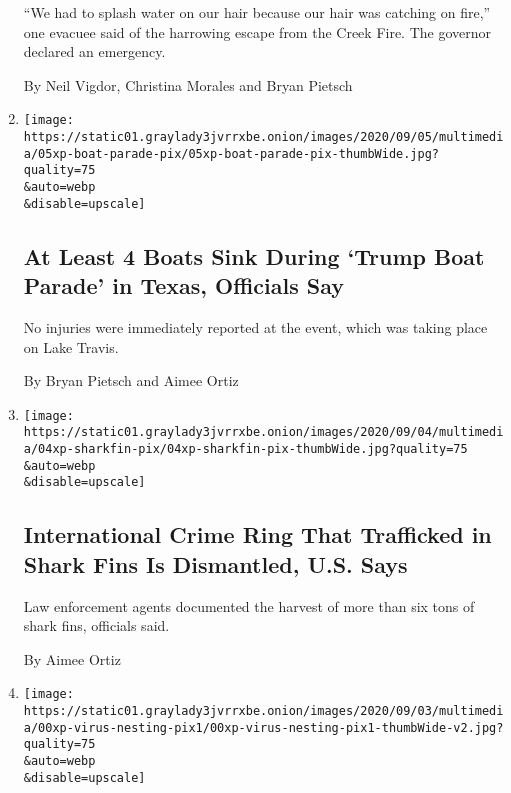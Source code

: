 \begin{enumerate}
  ``We had to splash water on our hair because our hair was catching on
  fire,'' one evacuee said of the harrowing escape from the Creek Fire.
  The governor declared an emergency.

  By Neil Vigdor, Christina Morales and Bryan Pietsch
\item
  \href{/2020/09/05/us/Texas-boat-parade-trump.html}{}

  \texttt{[image: https://static01.graylady3jvrrxbe.onion/images/2020/09/05/multimedia/05xp-boat-parade-pix/05xp-boat-parade-pix-thumbWide.jpg?quality=75\\\&auto=webp\\\&disable=upscale]}

  \hypertarget{at-least-4-boats-sink-during-trump-boat-parade-in-texas-officials-say}{%
  \subsection{At Least 4 Boats Sink During `Trump Boat Parade' in Texas,
  Officials
  Say}\label{at-least-4-boats-sink-during-trump-boat-parade-in-texas-officials-say}}

  No injuries were immediately reported at the event, which was taking
  place on Lake Travis.

  By Bryan Pietsch and Aimee Ortiz
\item
  \href{/2020/09/04/us/shark-fin-ring-georgia.html}{}

  \texttt{[image: https://static01.graylady3jvrrxbe.onion/images/2020/09/04/multimedia/04xp-sharkfin-pix/04xp-sharkfin-pix-thumbWide.jpg?quality=75\\\&auto=webp\\\&disable=upscale]}

  \hypertarget{international-crime-ring-that-trafficked-in-shark-fins-is-dismantled-us-says}{%
  \subsection{International Crime Ring That Trafficked in Shark Fins Is
  Dismantled, U.S.
  Says}\label{international-crime-ring-that-trafficked-in-shark-fins-is-dismantled-us-says}}

  Law enforcement agents documented the harvest of more than six tons of
  shark fins, officials said.

  By Aimee Ortiz
\item
  \href{/2020/09/04/business/coronavirus-home-upgrades.html}{}

  \texttt{[image: https://static01.graylady3jvrrxbe.onion/images/2020/09/03/multimedia/00xp-virus-nesting-pix1/00xp-virus-nesting-pix1-thumbWide-v2.jpg?quality=75\\\&auto=webp\\\&disable=upscale]}


\end{enumerate}

